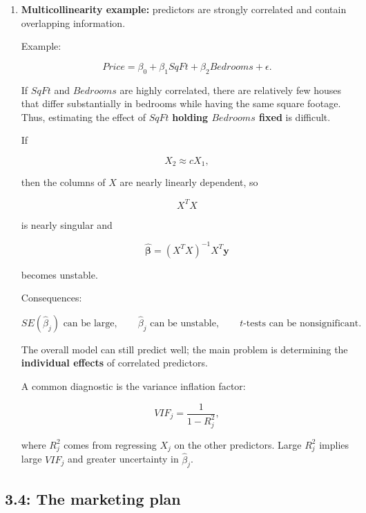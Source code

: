 \documentclass{article}
\begin{document}
\begin{enumerate}
\begin{enumerate}
\item \textbf{Association versus causation:}
Regression coefficients describe conditional associations. In observational data, they generally should not be interpreted as causal effects without additional assumptions or an appropriate research design.

\end{enumerate}

\item \textbf{Multicollinearity example:} predictors are strongly correlated and contain overlapping information.

Example:

$$
Price=\beta_0+\beta_1SqFt+\beta_2Bedrooms+\epsilon.
$$

If $SqFt$ and $Bedrooms$ are highly correlated, there are relatively few houses that differ substantially in bedrooms while having the same square footage. Thus, estimating the effect of $SqFt$ \textbf{holding $Bedrooms$ fixed} is difficult.

If

$$
X_2\approx cX_1,
$$

then the columns of $X$ are nearly linearly dependent, so

$$
X^TX
$$

is nearly singular and

$$
\hat{\boldsymbol{\beta}}=(X^TX)^{-1}X^T\mathbf{y}
$$

becomes unstable.

Consequences:

$$
SE(\hat{\beta}_j)\text{ can be large},\qquad
\hat{\beta}_j\text{ can be unstable},\qquad
t\text{-tests can be nonsignificant}.
$$

The overall model can still predict well; the main problem is determining the \textbf{individual effects} of correlated predictors.

A common diagnostic is the variance inflation factor:

$$
VIF_j=\frac{1}{1-R_j^2},
$$

where $R_j^2$ comes from regressing $X_j$ on the other predictors. Large $R_j^2$ implies large $VIF_j$ and greater uncertainty in $\hat{\beta}_j$.

\end{enumerate}


\subsection*{3.4: The marketing plan}
\end{document}
